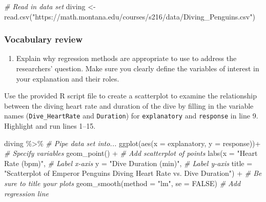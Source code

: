 \documentclass[
]{report}
\newenvironment{Shaded}{\begin{snugshade}}{\end{snugshade}}
\newcommand{\AttributeTok}[1]{\textcolor[rgb]{0.77,0.63,0.00}{#1}}
\newcommand{\CommentTok}[1]{\textcolor[rgb]{0.56,0.35,0.01}{\textit{#1}}}
\newcommand{\ConstantTok}[1]{\textcolor[rgb]{0.00,0.00,0.00}{#1}}
\newcommand{\FunctionTok}[1]{\textcolor[rgb]{0.00,0.00,0.00}{#1}}
\newcommand{\NormalTok}[1]{#1}
\newcommand{\OtherTok}[1]{\textcolor[rgb]{0.56,0.35,0.01}{#1}}
\newcommand{\SpecialCharTok}[1]{\textcolor[rgb]{0.00,0.00,0.00}{#1}}
\newcommand{\StringTok}[1]{\textcolor[rgb]{0.31,0.60,0.02}{#1}}
\providecommand{\tightlist}{%
  \setlength{\itemsep}{0pt}\setlength{\parskip}{0pt}}
\begin{document}
\begin{Shaded}
\begin{Highlighting}[]
\CommentTok{\# Read in data set}
\NormalTok{diving }\OtherTok{\textless{}{-}} \FunctionTok{read.csv}\NormalTok{(}\StringTok{"https://math.montana.edu/courses/s216/data/Diving\_Penguins.csv"}\NormalTok{)}
\end{Highlighting}
\end{Shaded}

\hypertarget{vocabulary-review-3}{%
\subsubsection*{Vocabulary review}\label{vocabulary-review-3}}

\begin{enumerate}
\def\labelenumi{\arabic{enumi}.}
\tightlist
\item
  Explain why regression methods are appropriate to use to address the researchers' question. Make sure you clearly define the variables of interest in your explanation and their roles.
\end{enumerate}

\vspace{.5in}

Use the provided R script file to create a scatterplot to examine the relationship between the diving heart rate and duration of the dive by filling in the variable names (\texttt{Dive\_HeartRate} and \texttt{Duration}) for \texttt{explanatory} and \texttt{response} in line 9. Highlight and run lines 1--15.

\begin{Shaded}
\begin{Highlighting}[]
\NormalTok{diving }\SpecialCharTok{\%\textgreater{}\%} \CommentTok{\# Pipe data set into...}
\FunctionTok{ggplot}\NormalTok{(}\FunctionTok{aes}\NormalTok{(}\AttributeTok{x =}\NormalTok{ explanatory, }\AttributeTok{y =}\NormalTok{ response))}\SpecialCharTok{+}  \CommentTok{\# Specify variables}
  \FunctionTok{geom\_point}\NormalTok{() }\SpecialCharTok{+}  \CommentTok{\# Add scatterplot of points}
  \FunctionTok{labs}\NormalTok{(}\AttributeTok{x =} \StringTok{"Heart Rate (bpm)"}\NormalTok{,  }\CommentTok{\# Label x{-}axis}
       \AttributeTok{y =} \StringTok{"Dive Duration (min)"}\NormalTok{,  }\CommentTok{\# Label y{-}axis}
       \AttributeTok{title =} \StringTok{"Scatterplot of Emperor Penguins Diving Heart Rate vs. Dive Duration"}\NormalTok{) }\SpecialCharTok{+} 
               \CommentTok{\# Be sure to title your plots}
  \FunctionTok{geom\_smooth}\NormalTok{(}\AttributeTok{method =} \StringTok{"lm"}\NormalTok{, }\AttributeTok{se =} \ConstantTok{FALSE}\NormalTok{)  }\CommentTok{\# Add regression line}
\end{Highlighting}
\end{Shaded}
\end{document}

